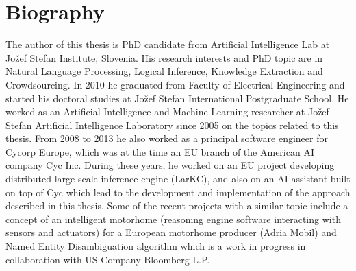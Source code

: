 % 
\chapter{Biography}

The author of this thesis is PhD candidate from Artificial Intelligence Lab at 
Jožef Stefan Institute, Slovenia. His research interests and PhD topic are in 
Natural Language Processing, Logical Inference, Knowledge Extraction and
Crowdsourcing. In 2010 he graduated from Faculty of Electrical Engineering and
started his doctoral studies at Jožef Stefan International Postgraduate School.
He worked as an Artificial Intelligence and Machine Learning researcher at
Jožef Stefan Artificial Intelligence Laboratory since 2005 on the topics related
to this thesis. From 2008 to 2013 he also worked as a principal software 
engineer for Cycorp Europe, which was at the time an EU branch of the American 
AI company Cyc Inc. During these years, he worked on an EU project developing 
distributed large scale inference engine (LarKC), and also on an AI assistant 
built on top of Cyc which lead to the development and implementation of the
approach described in this thesis. Some of the recent projects with a similar
topic include a concept of an intelligent motorhome (reasoning engine software 
interacting with sensors and actuators) for a European motorhome producer 
(Adria Mobil) and Named Entity Disambiguation algorithm which is a work in 
progress in collaboration with US Company Bloomberg L.P.
